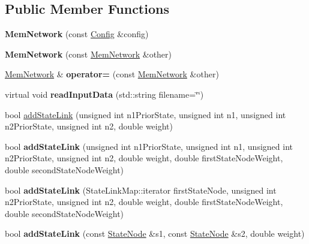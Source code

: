\subsection*{Public Member Functions}
\begin{DoxyCompactItemize}
\item 
\mbox{\label{classMemNetwork_a3f2dccd42343679d2cdecd4496a793a7}} 
{\bfseries Mem\+Network} (const \mbox{\hyperlink{structConfig}{Config}} \&config)
\item 
\mbox{\label{classMemNetwork_a0e87a2663a07e17318081c531e9700fd}} 
{\bfseries Mem\+Network} (const \mbox{\hyperlink{classMemNetwork}{Mem\+Network}} \&other)
\item 
\mbox{\label{classMemNetwork_a367df9f78eec8a77fbc1641a3a688d94}} 
\mbox{\hyperlink{classMemNetwork}{Mem\+Network}} \& {\bfseries operator=} (const \mbox{\hyperlink{classMemNetwork}{Mem\+Network}} \&other)
\item 
\mbox{\label{classMemNetwork_ae6270848b45e64c7eca02729f2a5d562}} 
virtual void {\bfseries read\+Input\+Data} (std\+::string filename=\char`\"{}\char`\"{})
\item 
bool \mbox{\hyperlink{classMemNetwork_aed51978dfece1214f4fa9ea2bfebc492}{add\+State\+Link}} (unsigned int n1\+Prior\+State, unsigned int n1, unsigned int n2\+Prior\+State, unsigned int n2, double weight)
\item 
\mbox{\label{classMemNetwork_a37d94f61d885fb39edcde2800cd49a7c}} 
bool {\bfseries add\+State\+Link} (unsigned int n1\+Prior\+State, unsigned int n1, unsigned int n2\+Prior\+State, unsigned int n2, double weight, double first\+State\+Node\+Weight, double second\+State\+Node\+Weight)
\item 
\mbox{\label{classMemNetwork_a0d404d08ee81830ae2a335ff7350b2c3}} 
bool {\bfseries add\+State\+Link} (State\+Link\+Map\+::iterator first\+State\+Node, unsigned int n2\+Prior\+State, unsigned int n2, double weight, double first\+State\+Node\+Weight, double second\+State\+Node\+Weight)
\item 
\mbox{\label{classMemNetwork_add3e62a4019d3ee07045c499aa730c0c}} 
bool {\bfseries add\+State\+Link} (const \mbox{\hyperlink{structStateNode}{State\+Node}} \&s1, const \mbox{\hyperlink{structStateNode}{State\+Node}} \&s2, double weight)

\end{DoxyCompactItemize}
